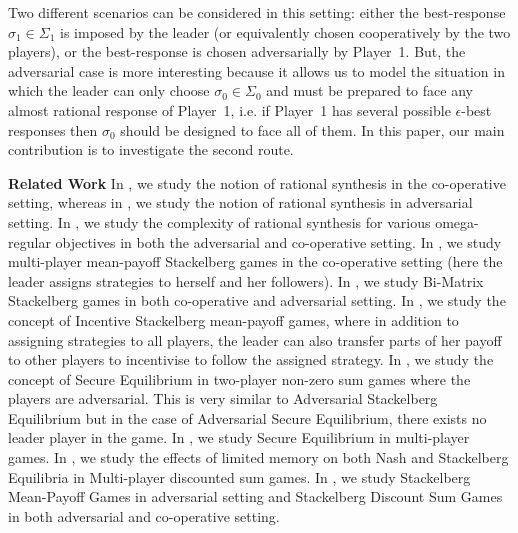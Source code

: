 Two different scenarios can be considered in this setting: either the best-response $\sigma_1 \in \Sigma_1$ is imposed by the leader (or equivalently chosen cooperatively by the two players), or the best-response is chosen adversarially by Player~1. But, the adversarial case is more interesting because it allows us to model the situation in which the leader can only choose $\sigma_0 \in \Sigma_0$ and must be prepared to face any almost rational response of Player~1, i.e. if Player~1 has several possible $\epsilon$-best responses then $\sigma_0$ should be designed to face all of them. In this paper, our main contribution is to investigate the second route.

\textbf{Related Work} In \cite{FKL10}, we study the notion of rational synthesis in the co-operative setting, whereas in \cite{KPV16}, we study the notion of rational synthesis in adversarial setting. In \cite{CFGR16}, we study the complexity of rational synthesis for various omega-regular objectives in both the adversarial and co-operative setting. In \cite{GS14}, we study multi-player mean-payoff Stackelberg games in the co-operative setting (here the leader assigns strategies to herself and her followers). In \cite{GS18}, we study Bi-Matrix Stackelberg games in both co-operative and adversarial setting. In \cite{GSTDP16}, we study the concept of Incentive Stackelberg mean-payoff games, where in addition to assigning strategies to all players, the leader can also transfer parts of her payoff to other players to incentivise to follow the assigned strategy. In \cite{CHJ06}, we study the concept of Secure Equilibrium in two-player non-zero sum games where the players are adversarial.  This is very similar to Adversarial Stackelberg Equilibrium but in the case of Adversarial Secure Equilibrium, there exists no leader player in the game.  In \cite{PFKSV14}, we study Secure Equilibrium in multi-player games.  In \cite{GS15}, we study the effects of limited memory on both Nash and Stackelberg Equilibria in Multi-player discounted sum games. In \cite{FGR20}, we study Stackelberg Mean-Payoff Games in adversarial setting and  Stackelberg Discount Sum Games in both adversarial and co-operative setting.

